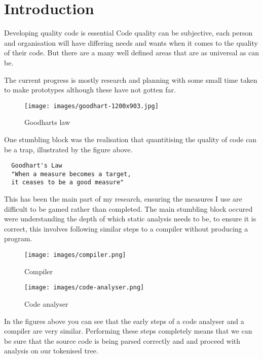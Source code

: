 \section{Introduction}
Developing quality code is essential 
Code quality can be subjective, each person and organisation will have differing needs and wants when it comes to the quality of their code. But there are a many well defined areas that are as universal as can be.

The current progress is mostly research and planning with some small time taken to make prototypes although these have not gotten far.
\newline
\begin{figure}
  \texttt{[image: images/goodhart-1200x903.jpg]}
  \caption{Goodharts law}
  \label{fig:goodhart}
\end{figure}
One stumbling block was the realisation that quantitising the quality of code can be a trap, illustrated by the figure above.
\begin{verbatim}
  Goodhart's Law 
  "When a measure becomes a target, 
  it ceases to be a good measure"
\end{verbatim}
This has been the main part of my research, ensuring the measures I use are difficult to be gamed rather than completed.
\newline
The main stumbling block occured were understanding the depth of which static analysis needs to be, to ensure it is correct, this involves following similar steps to a compiler without producing a program.

\begin{figure}
  \texttt{[image: images/compiler.png]}
  \caption{Compiler}
  \label{fig:comp}
\end{figure}
\begin{figure}
  \texttt{[image: images/code-analyser.png]}
  \caption{Code analyser}
  \label{fig:codeanalyser}
\end{figure}

In the figures above you can see that the early steps of a code analyser and a compiler are very similar. Performing these steps completely means that we can be sure that the source code is being parsed correctly and and proceed with analysis on our tokenised tree.



